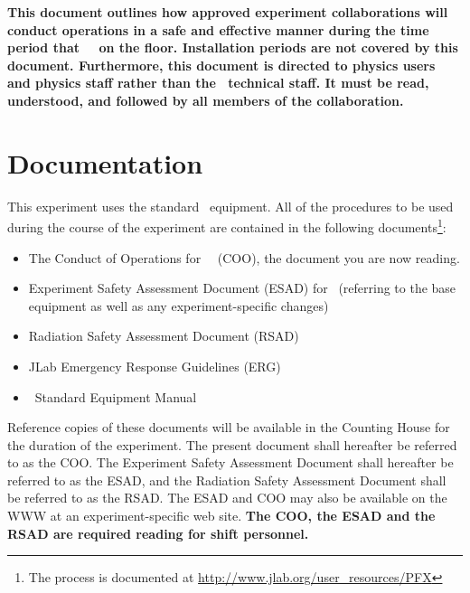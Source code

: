 \documentclass[10pt]{article}
\begin{document}
{\bf This document outlines how approved experiment collaborations will conduct
operations in a safe and effective manner during the time period that
\EXPTS\ \BETENSE\ on the floor. Installation
periods are not covered by this document.
Furthermore, this document is directed to physics users and
physics staff rather than the \HALL\ technical staff.  It must be read,
understood, and followed by all members of the collaboration. }

\section{Documentation}

This experiment uses the standard \HALL\ equipment.
All of the procedures to be used during the course of the experiment are contained in the following
documents\footnote{The process is documented at \url{http://www.jlab.org/user_resources/PFX} }:

\begin{itemize}

\item  The Conduct of Operations for \HALL\ \EXPTS\
 (COO), the document you are now reading.

\item   Experiment Safety Assessment Document (ESAD)
for \EXPTS\ (referring to the base equipment as well as any
experiment-specific changes)

\item Radiation Safety Assessment Document (RSAD)

\item JLab Emergency Response Guidelines (ERG)

\item \HALL\ Standard Equipment Manual

\end{itemize}


Reference copies of these documents will be available in the Counting
House for the duration of the experiment. The present document shall
hereafter be referred to as the COO. The Experiment Safety Assessment
Document shall hereafter be referred to as the ESAD, and the
Radiation Safety Assessment Document shall be referred to as the RSAD.
The ESAD and COO may also be available on the WWW at an experiment-specific
web site. {\bf The COO, the ESAD and the RSAD are required reading for
shift personnel.}
\end{document}
